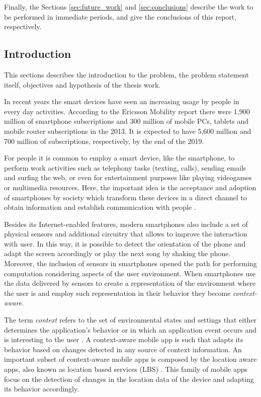 Finally, the Sections \ref{sec:future_work} and \ref{sec:conclusions} describe the work to be performed in immediate periods, and give the conclusions of this report, respectively.

\subsection{Introduction}
\label{sub:introduction}
This sections describes the introduction to the problem, the problem statement itself, objectives and hypothesis of the thesis work.

In recent years the smart devices have seen an increasing usage by people in every day activities.
According to the Ericsson Mobility report \cite{Ericson2014} there were 1,900 million of smartphone subscriptions and 300 million of mobile PCs, tablets and mobile router subscriptions in the 2013.
It is expected to have 5,600 million and 700 million of subscriptions, respectively, by the end of the 2019.


For people it is common to employ a smart device, like the smartphone, to perform work activities such as telephony tasks (texting, calls), sending emails and surfing the web, or even for entertainment purposes like playing videogames or multimedia resources. 
Here, the important idea is the acceptance and adoption of smartphones by society which transform these devices in a direct channel to obtain information and establish communication with people \cite{Perez-Torres2012}.


Besides its Internet-enabled features, modern smartphones also include a set of physical sensors and additional circuitry that allows to improve the interaction with user. In this way, it is possible to detect the orientation of the phone and adapt the screen accordingly or play the next song by shaking the phone.
Moreover, the inclusion of sensors in smartphones opened the path for performing computation considering aspects of the user environment. When smartphones use the data delivered by sensors to create a representation of the environment where the user is and employ such representation in their behavior they become \emph{context-aware}.


The term \emph{context} refers to the set of environmental states and settings that either determines the application’s behavior or in which an application event occurs and is interesting to the user \cite{Chen2000}.
A context-aware mobile app is such that adapts its behavior based on changes detected in any source of context information.
An important subset of context-aware mobile apps is composed by the location aware apps, also known as location based services (LBS) \cite{Zhuang2010,Kjaergaard2012}. 
This family of mobile apps focus on the detection of changes in the location data of the device and adapting its behavior accordingly.


